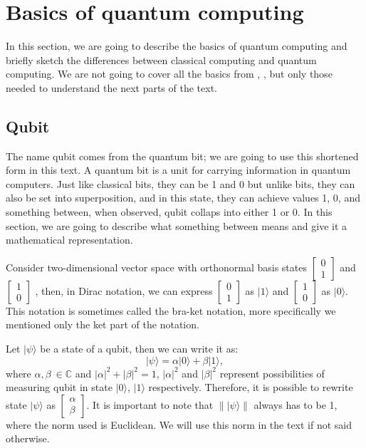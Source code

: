 \chapter{Basics of quantum computing}

In this section, we are going to describe the basics of quantum computing and briefly sketch the differences between classical computing and quantum computing. We are not going to cover all the basics from \cite{adedoyin2018quantum}, \cite{strubell2011introduction}, but only those needed to understand the next parts of the text. 

\section{Qubit}

The name qubit comes from the quantum bit; we are going to use this shortened form in this text. A quantum bit is a unit for carrying information in quantum computers. Just like classical bits, they can be 1 and 0 but unlike bits, they can also be set into superposition, and in this state, they can achieve values 1, 0, and something between, when observed, qubit collaps into either 1 or 0. In this section, we are going to describe what something between means and give it a mathematical representation.


Consider two-dimensional vector space with orthonormal basis states 
$\begin{bmatrix}
     0\\
     1
\end{bmatrix}$
and
$\begin{bmatrix}
     1\\
     0
\end{bmatrix}$
, then, in Dirac notation, we can express 
$\begin{bmatrix}
     0\\
     1
\end{bmatrix}$
as
$|1\rangle$
and
$\begin{bmatrix}
     1\\
     0
\end{bmatrix}$
as
$|0\rangle$. This notation is sometimes called the bra-ket notation, more specifically we mentioned only the ket part of the notation. 

Let $| \psi \rangle$ be a  state of a qubit, then we can write it as:
\begin{equation}
    |\psi\rangle = \alpha |0\rangle +\beta |1\rangle ,
\end{equation}
where $\alpha, \beta \ \in \mathbb{C}$ and  $|\alpha|^2 + |\beta|^2 = 1$, $|\alpha| ^2$ and $|\beta| ^2$ represent possibilities of measuring qubit in state $| 0 \rangle$, $|1\rangle$ respectively. Therefore, it is possible to rewrite state $| \psi \rangle$ as 
$\begin{bmatrix}
    \alpha \\
    \beta
\end{bmatrix}$. It is important to note that $\lVert | \psi \rangle \rVert$ always has to be 1, where the norm used is Euclidean. We will use this norm in the text if not said otherwise.

